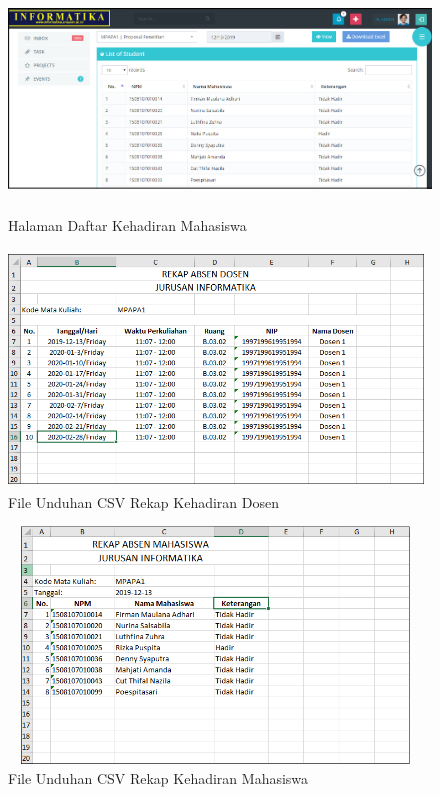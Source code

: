 \begin{enumerate}[a.]
	      \vspace{-0.2cm}
	      \begin{figure}[H]
		      \center
		      \includegraphics [width = 13cm, height= 6cm]{gambar/web/dashboard-mahasiswa}
		      \caption{Halaman Daftar Kehadiran Mahasiswa}
		      \label{web-daftar-mahasiswa}
	      \end{figure}

	      \vspace{-0.2cm}
	      \begin{figure}[H]
		      \center
		      \includegraphics [width = 11cm, height= 6.3cm]{gambar/web/rekap-dosen}
		      \caption{File Unduhan CSV Rekap Kehadiran Dosen}
		      \label{web-csv-dosen}
	      \end{figure}

	      \vspace{-0.2cm}
	      \begin{figure}[H]
		      \center
		      \includegraphics [width = 11cm, height= 6.3cm]{gambar/web/rekap-mahasiswa}
		      \caption{File Unduhan CSV Rekap Kehadiran Mahasiswa}
		      \label{web-csv-mahasiswa}
	      \end{figure}

\end{enumerate}

